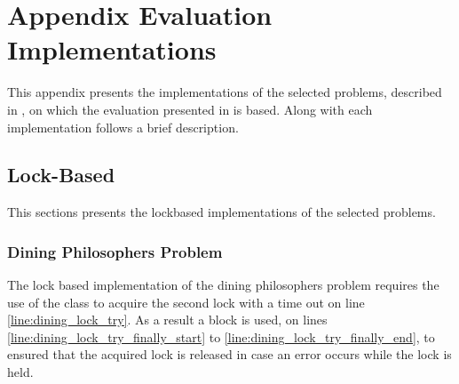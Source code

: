 \chapter[]{Appendix Evaluation Implementations}
This appendix presents the implementations of the selected problems, described in , on which the evaluation presented in  is based. Along with each implementation follows a brief description.
\label{app:eval_implementations}

\section{Lock-Based}\label{app:impl_lockbased}
This sections presents the lockbased implementations of the selected problems.

\subsection{Dining Philosophers Problem}
The lock based implementation of the dining philosophers problem requires the use of the  class to acquire the second lock with a time out on line \ref{line:dining_lock_try}. As a result a  block is used, on lines \ref{line:dining_lock_try_finally_start} to \ref{line:dining_lock_try_finally_end}, to ensured that the acquired lock is released in case an error occurs while the lock is held.
